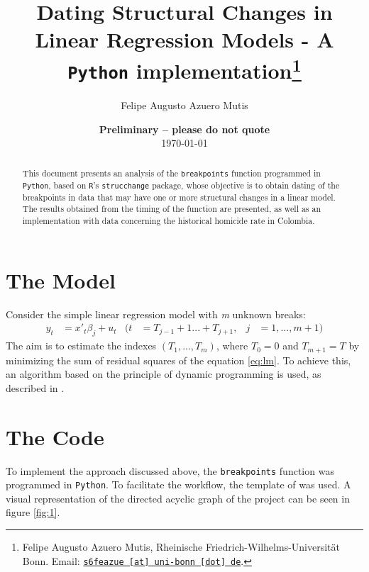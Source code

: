 \documentclass[11pt, a4paper, leqno]{article}
\begin{document}
\title{Dating Structural Changes in Linear Regression Models - A \texttt{Python} implementation\thanks{Felipe Augusto Azuero Mutis, Rheinische Friedrich-Wilhelms-Universität Bonn. Email: \href{mailto:s6feazue@uni-bonn.de}{\nolinkurl{s6feazue [at] uni-bonn [dot] de}}.}}

\author{Felipe Augusto Azuero Mutis}

\date{
{\bf Preliminary -- please do not quote}
\\[1ex]
\today
}

\maketitle


\begin{abstract}
	This document presents an analysis of the \texttt{breakpoints} function programmed in \texttt{Python}, based on \texttt{R}'s \texttt{strucchange} package, whose objective is to obtain dating of the breakpoints in data that may have one or more structural changes in a linear model. The results obtained from the timing of the function are presented, as well as an implementation with data concerning the historical homicide rate in Colombia.
\end{abstract}
\clearpage

\section{The Model} %
\label{sec:model}

Consider the simple linear regression model with \textit{m} unknown breaks:
\begin{align} \label{eq:lm}
    y_t &= x'_{t}\beta_{j} + u_{t}  & (t &= T_{j-1}+1...+T_{j+1}, & j &= 1,...,m+1 )
\end{align}
The aim is to estimate the indexes $(T_{1},...,T_{m})$, where $T_{0} = 0$ and $T_{m+1} = T$ by minimizing the sum of residual squares of the equation \ref{eq:lm}.  To achieve this, an algorithm based on the principle of dynamic programming is used, as described in \cite{bai2003computation}.


\section{The Code}
\label{sec:code}
To implement the approach discussed above, the \texttt{breakpoints} function was programmed in \texttt{Python}. To facilitate the workflow, the template of \citet{gaudecker2019templates} was used.  A visual representation of the directed acyclic graph of the project can be seen in figure \ref{fig:1}. \\
\end{document}
